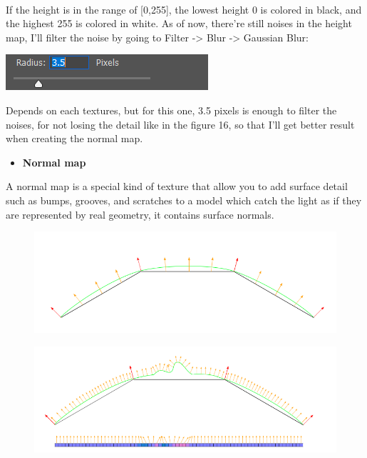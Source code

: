 \documentclass[a4paper, 13pt]{extarticle}
\begin{document}
  \\[0.2cm]
  If the height is in the range of [0,255], the lowest height 0 is colored in black, and the highest 255 is colored in white. As of now, there're still noises in the height map, I'll filter the noise by going to Filter -> Blur -> Gaussian Blur: \begin{minipage}{0.21\textwidth}
  	\includegraphics[width=\linewidth]{intructions/guassian_blur.png}
  \end{minipage}  Depends on each textures, but for this one, 3.5 pixels is enough to filter the noises, for not losing the detail like in the figure 16, so that I'll get better result when creating the normal map.  
\begin{itemize}
	\item \bfseries Normal map	 	
\end{itemize}
  A normal map is a special kind of texture that allow you to add surface detail such as bumps, grooves, and scratches to a model which catch the light as if they are represented by real geometry, it contains surface normals. 
  \begin{figure}[h]
  	\begin{minipage}{.45\textwidth}
  		\centering
  		\includegraphics[width=1\linewidth]{intructions/surface_normal.png}
  		\centering
  		\label{fig:test18}
  	\end{minipage}
  	\begin{minipage}{.4\textwidth}
  		\centering
  		\includegraphics[width=1.6\linewidth]{intructions/surface_normal_across.png}
  		\centering
  		\label{fig:test179}
  	\end{minipage}
  \end{figure}
\end{document}
